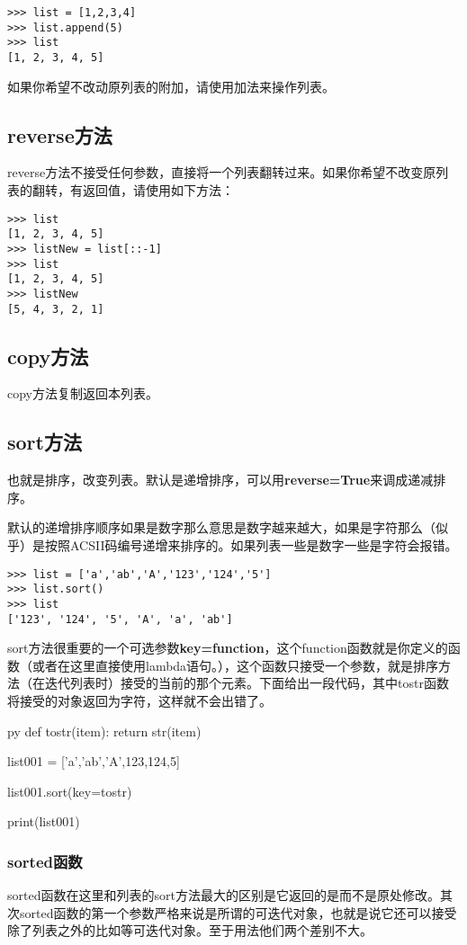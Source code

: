 \documentclass[12pt,oneside]{book}
\begin{document}
\begin{common-format}
\begin{Verbatim}
>>> list = [1,2,3,4]
>>> list.append(5)
>>> list
[1, 2, 3, 4, 5]
\end{Verbatim}

如果你希望不改动原列表的附加，请使用加法来操作列表。

\subsection{reverse方法}
reverse方法不接受任何参数，直接将一个列表翻转过来。如果你希望不改变原列表的翻转，有返回值，请使用如下方法：
\begin{Verbatim}
>>> list
[1, 2, 3, 4, 5]
>>> listNew = list[::-1]
>>> list
[1, 2, 3, 4, 5]
>>> listNew
[5, 4, 3, 2, 1]
\end{Verbatim}

\subsection{copy方法}
copy方法复制返回本列表。


\subsection{sort方法}
也就是排序，改变列表。默认是递增排序，可以用\textbf{reverse=True}来调成递减排序。

默认的递增排序顺序如果是数字那么意思是数字越来越大，如果是字符那么（似乎）是按照ACSII码编号递增来排序的。如果列表一些是数字一些是字符会报错。
\begin{Verbatim}
>>> list = ['a','ab','A','123','124','5']
>>> list.sort()
>>> list
['123', '124', '5', 'A', 'a', 'ab']
\end{Verbatim}

sort方法很重要的一个可选参数\textbf{key=function}，这个function函数就是你定义的函数（或者在这里直接使用lambda语句。），这个函数只接受一个参数，就是排序方法（在迭代列表时）接受的当前的那个元素。下面给出一段代码，其中tostr函数将接受的对象返回为字符，这样就不会出错了。
\begin{xverbatim}[129]{py}
def tostr(item):
    return str(item)

list001 = ['a','ab','A',123,124,5]

list001.sort(key=tostr)

print(list001)
\end{xverbatim}

\subsubsection{sorted函数}
sorted函数在这里和列表的sort方法最大的区别是它返回的是而不是原处修改。其次sorted函数的第一个参数严格来说是所谓的可迭代对象，也就是说它还可以接受除了列表之外的比如等可迭代对象。至于用法他们两个差别不大。


\end{common-format}
\end{document}
